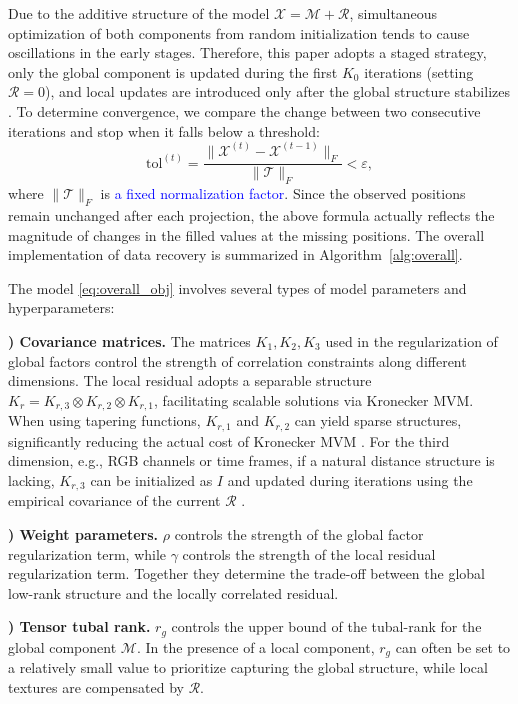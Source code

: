 \documentclass[a4paper,12pt]{article}
\numberwithin{equation}{section}
\numberwithin{algorithm}{section}
\theoremstyle{remark}
\theoremstyle{definition}
\begin{document}
Due to the additive structure of the model $\mathcal{X}=\mathcal{M}+\mathcal{R}$, simultaneous optimization of both components from random initialization tends to cause oscillations in the early stages. Therefore, this paper adopts a staged strategy, only the global component is updated during the first $K_0$ iterations (setting $\mathcal{R}=0$), and local updates are introduced only after the global structure stabilizes \cite{lei2024glskf}. To determine convergence, we compare the change between two consecutive iterations and stop when it falls below a threshold:
\begin{equation}
	\mathrm{tol}^{(t)}=\frac{\|\mathcal{X}^{(t)}-\mathcal{X}^{(t-1)}\|_F}{\|\mathcal{T}\|_F}<\varepsilon,
\end{equation}
where $\|\mathcal{T}\|_F$ is \textcolor{blue}{a fixed normalization factor}.
Since the observed positions remain unchanged after each projection, the above formula actually reflects the magnitude of changes in the filled values at the missing positions.
The overall implementation of data recovery is summarized in Algorithm~\ref{alg:overall}.





The model \eqref{eq:overall_obj} involves several types of model parameters and hyperparameters:

\textbf{) Covariance matrices.}
The matrices $K_1,K_2,K_3$ used in the regularization of global factors control the strength of correlation constraints along different dimensions.
The local residual adopts a separable structure $K_r=K_{r,3}\otimes K_{r,2}\otimes K_{r,1}$, facilitating scalable solutions via Kronecker MVM.
When using tapering functions, $K_{r,1}$ and $K_{r,2}$ can yield sparse structures, significantly reducing the actual cost of Kronecker MVM \cite{gneiting2002compact,furrer2006tapering}.
For the third dimension, e.g., RGB channels or time frames, if a natural distance structure is lacking, $K_{r,3}$ can be initialized as $I$ and updated during iterations using the empirical covariance of the current $\mathcal{R}$ \cite{lei2024glskf}.

\textbf{) Weight parameters.}
$\rho$ controls the strength of the global factor regularization term,
while $\gamma$ controls the strength of the local residual regularization term. Together they determine the trade-off between the global low-rank structure and the locally correlated residual.

\textbf{) Tensor tubal rank.}
$r_g$ controls the upper bound of the tubal-rank for the global component $\mathcal{M}$.
In the presence of a local component, $r_g$ can often be set to a relatively small value to prioritize capturing the global structure, while local textures are compensated by $\mathcal{R}$.
\end{document}
